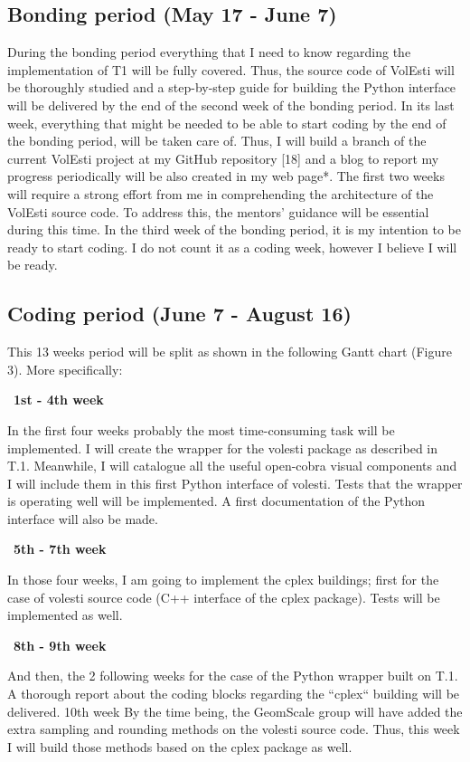 \documentclass{article}
\begin{document}
\subsection{Bonding period (May 17 - June 7)}
During the bonding period everything that I need to know regarding the implementation of T1 will be fully covered. 
Thus, the source code of VolEsti will be thoroughly studied and a step-by-step guide for building the Python interface will be delivered by the end of the second week of the bonding period. 
In its last week, everything that might be needed to be able to start coding by the end of the bonding period, will be taken care of.
Thus, I will build a branch of the current VolEsti project at my GitHub repository [18] and a blog to report my progress periodically will be also created in my web page*. 
The first two weeks will require a strong effort from me in comprehending the architecture of the VolEsti source code. 
To address this, the mentors’ guidance will be essential during this time. 
In the third week of the bonding period, it is my intention to be ready to start coding. I do not count it as a coding week, however I believe I will be ready.



\subsection{Coding period (June 7 - August 16)}
This 13 weeks period will be split as shown in the following Gantt chart (Figure 3).  More specifically:


\textbullet\ \textbf{1st - 4th week }

In the first four weeks probably the most time-consuming task will be implemented. 
I will create the wrapper for the volesti package as described in T.1. 
Meanwhile, I will catalogue all the useful open-cobra visual components and I will include them in this first Python interface of volesti. 
Tests that the wrapper is operating well will be implemented. 
A first documentation of the Python interface will also be made.

\textbullet\ \textbf{5th - 7th week}

In those four weeks, I am going to implement the cplex buildings; first for the case of volesti source code (C++ interface of the cplex package). 
Tests will be implemented as well. 

\textbullet\ \textbf{8th - 9th week}

And then, the 2 following weeks for the case of the Python wrapper built on T.1. 
A thorough report about the coding blocks regarding the “cplex“ building will be delivered.
10th week
By the time being, the GeomScale group will have added the extra sampling and rounding methods on the volesti source code. 
Thus, this week I will build those methods based on the cplex package as well.
\end{document}
